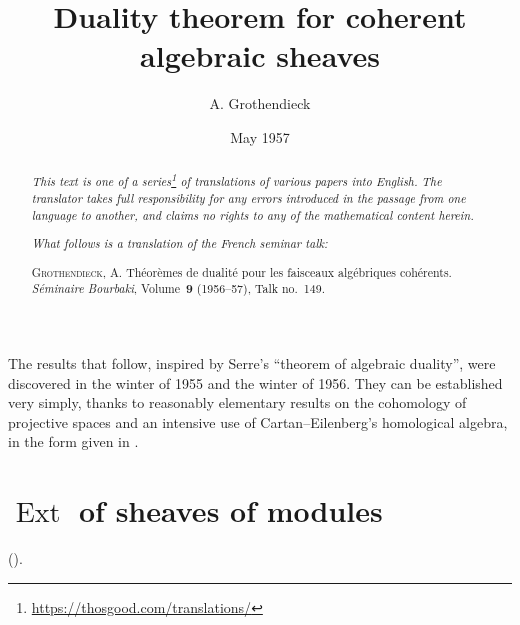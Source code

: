 \documentclass{article}
\title{Duality theorem for coherent algebraic sheaves}
\author{A. Grothendieck}
\date{May 1957}
\theoremstyle{plain}
\theoremstyle{definition}
\DeclareMathOperator{\Ext}{Ext}
\newcommand{\oldpage}[1]{\marginpar{\footnotesize$\Big\vert$ \textit{p.~#1}}}
\begin{document}
\maketitle
\thispagestyle{fancy}

\renewcommand{\abstractname}{Translator's note.}

\begin{abstract}
  \renewcommand*{\thefootnote}{\fnsymbol{footnote}}
  \emph{This text is one of a series\footnote{\url{https://thosgood.com/translations/}} of translations of various papers into English.}
  \emph{The translator takes full responsibility for any errors introduced in the passage from one language to another, and claims no rights to any of the mathematical content herein.}

  \medskip
  
  \emph{What follows is a translation of the French seminar talk:}

  \medskip\noindent
  \textsc{Grothendieck, A.}
  Th\'{e}or\`{e}mes de dualit\'{e} pour les faisceaux alg\'{e}briques coh\'{e}rents.
  \emph{S\'{e}minaire Bourbaki}, Volume~\textbf{9} (1956--57), Talk no.~149.
\end{abstract}

\setcounter{footnote}{0}

\tableofcontents
\bigskip



\oldpage{149-01}
The results that follow, inspired by Serre's ``theorem of algebraic duality'', were discovered in the winter of 1955 and the winter of 1956.
They can be established very simply, thanks to reasonably elementary results on the cohomology of projective spaces \cite{3} and an intensive use of Cartan--Eilenberg's homological algebra, in the form given in \cite{2}.


\section{\texorpdfstring{$\Ext$}{Ext} of sheaves of modules}
\label{section1}

(\cite[chap.~3 and 4]{2}).
\end{document}
